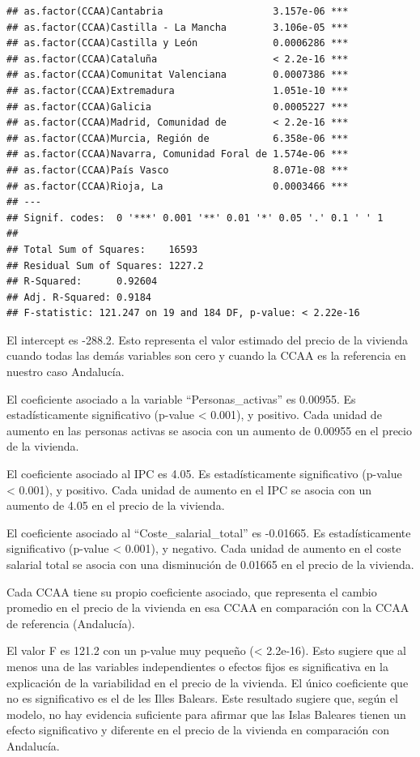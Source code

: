 \documentclass[
]{article}
\begin{document}
\begin{verbatim}
## as.factor(CCAA)Cantabria                   3.157e-06 ***
## as.factor(CCAA)Castilla - La Mancha        3.106e-05 ***
## as.factor(CCAA)Castilla y León             0.0006286 ***
## as.factor(CCAA)Cataluña                    < 2.2e-16 ***
## as.factor(CCAA)Comunitat Valenciana        0.0007386 ***
## as.factor(CCAA)Extremadura                 1.051e-10 ***
## as.factor(CCAA)Galicia                     0.0005227 ***
## as.factor(CCAA)Madrid, Comunidad de        < 2.2e-16 ***
## as.factor(CCAA)Murcia, Región de           6.358e-06 ***
## as.factor(CCAA)Navarra, Comunidad Foral de 1.574e-06 ***
## as.factor(CCAA)País Vasco                  8.071e-08 ***
## as.factor(CCAA)Rioja, La                   0.0003466 ***
## ---
## Signif. codes:  0 '***' 0.001 '**' 0.01 '*' 0.05 '.' 0.1 ' ' 1
## 
## Total Sum of Squares:    16593
## Residual Sum of Squares: 1227.2
## R-Squared:      0.92604
## Adj. R-Squared: 0.9184
## F-statistic: 121.247 on 19 and 184 DF, p-value: < 2.22e-16
\end{verbatim}

El intercept es -288.2. Esto representa el valor estimado del precio de
la vivienda cuando todas las demás variables son cero y cuando la CCAA
es la referencia en nuestro caso Andalucía.

El coeficiente asociado a la variable ``Personas\_activas'' es 0.00955.
Es estadísticamente significativo (p-value \textless{} 0.001), y
positivo. Cada unidad de aumento en las personas activas se asocia con
un aumento de 0.00955 en el precio de la vivienda.

El coeficiente asociado al IPC es 4.05. Es estadísticamente
significativo (p-value \textless{} 0.001), y positivo. Cada unidad de
aumento en el IPC se asocia con un aumento de 4.05 en el precio de la
vivienda.

El coeficiente asociado al ``Coste\_salarial\_total'' es -0.01665. Es
estadísticamente significativo (p-value \textless{} 0.001), y negativo.
Cada unidad de aumento en el coste salarial total se asocia con una
disminución de 0.01665 en el precio de la vivienda.

Cada CCAA tiene su propio coeficiente asociado, que representa el cambio
promedio en el precio de la vivienda en esa CCAA en comparación con la
CCAA de referencia (Andalucía).

El valor F es 121.2 con un p-value muy pequeño (\textless{} 2.2e-16).
Esto sugiere que al menos una de las variables independientes o efectos
fijos es significativa en la explicación de la variabilidad en el precio
de la vivienda. El único coeficiente que no es significativo es el de
les Illes Balears. Este resultado sugiere que, según el modelo, no hay
evidencia suficiente para afirmar que las Islas Baleares tienen un
efecto significativo y diferente en el precio de la vivienda en
comparación con Andalucía.
\end{document}
